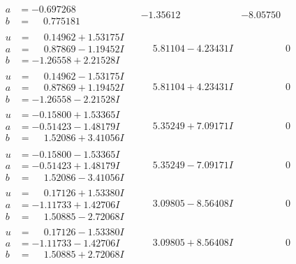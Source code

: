 \documentclass[1p]{elsarticle_modified}
\theoremstyle{definition}
\begin{document}
$$\begin{array}{c|c|c}
\begin{aligned}
a &= -0.697268\phantom{ +0.000000I} \\
b &= \phantom{-}0.775181\phantom{ +0.000000I}\end{aligned}
 & -1.35612\phantom{ +0.000000I} & -8.05750\phantom{ +0.000000I} \\ \hline\begin{aligned}
u &= \phantom{-}0.14962 + 1.53175 I \\
a &= \phantom{-}0.87869 - 1.19452 I \\
b &= -1.26558 + 2.21528 I\end{aligned}
 & \phantom{-}5.81104 - 4.23431 I & \phantom{-0.000000 } 0 \\ \hline\begin{aligned}
u &= \phantom{-}0.14962 - 1.53175 I \\
a &= \phantom{-}0.87869 + 1.19452 I \\
b &= -1.26558 - 2.21528 I\end{aligned}
 & \phantom{-}5.81104 + 4.23431 I & \phantom{-0.000000 } 0 \\ \hline\begin{aligned}
u &= -0.15800 + 1.53365 I \\
a &= -0.51423 - 1.48179 I \\
b &= \phantom{-}1.52086 + 3.41056 I\end{aligned}
 & \phantom{-}5.35249 + 7.09171 I & \phantom{-0.000000 } 0 \\ \hline\begin{aligned}
u &= -0.15800 - 1.53365 I \\
a &= -0.51423 + 1.48179 I \\
b &= \phantom{-}1.52086 - 3.41056 I\end{aligned}
 & \phantom{-}5.35249 - 7.09171 I & \phantom{-0.000000 } 0 \\ \hline\begin{aligned}
u &= \phantom{-}0.17126 + 1.53380 I \\
a &= -1.11733 + 1.42706 I \\
b &= \phantom{-}1.50885 - 2.72068 I\end{aligned}
 & \phantom{-}3.09805 - 8.56408 I & \phantom{-0.000000 } 0 \\ \hline\begin{aligned}
u &= \phantom{-}0.17126 - 1.53380 I \\
a &= -1.11733 - 1.42706 I \\
b &= \phantom{-}1.50885 + 2.72068 I\end{aligned}
 & \phantom{-}3.09805 + 8.56408 I & \phantom{-0.000000 } 0 \\ \hline\begin{aligned}

\end{aligned}
\end{array}$$
\end{document}

